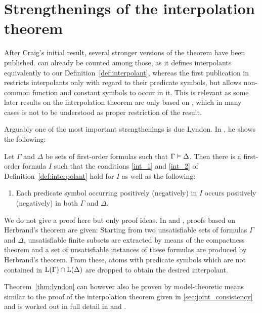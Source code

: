 \section{Strengthenings of the interpolation theorem}
\label{sec:strengthenings}

After Craig's initial result, several stronger versions of the theorem have been published.
\cite{Craig57three} can already be counted among those,
as it defines interpolants equivalently to our Definition~\ref{def:interpolant}, 
whereas the first publication in \cite{Craig57linear} restricts interpolants only with regard to their predicate symbols, but allows non-common function and constant symbols to occur in it.
This is relevant as some later results on the interpolation theorem are only based on \cite{Craig57linear}, which in many cases is not to be understood as proper restriction of the result.


Arguably one of the most important strengthenings is due Lyndon. In \cite{lyndon59}, he shows the following:

\begin{thm}[Lyndon]
	\label{thm:lyndon}
Let $\Gamma$ and $\Delta$ be sets of first-order formulas such that $\Gamma \entails\nolinebreak \Delta$. 
Then there is a first-order formula $I$ such that the conditions \ref{int_1} and \ref{int_2} of Definition~\ref{def:interpolant} hold for $I$ as well as the following:
\begin{enumerate}
		\renewcommand{\theenumi}{\arabic{enumi}'}
		\setcounter{enumi}{2}
	\item Each predicate symbol occurring positively (negatively) in $I$ occurs positively (negatively) in both $\Gamma$ and $\Delta$.
		\label{int_lyndon_3}
\end{enumerate}
\end{thm}

We do not give a proof here but only proof ideas.
In \cite{lyndon59} and \cite{slagle70}, proofs based on Herbrand's theorem are given:
Starting from two unsatisfiable sets of formulas $\Gamma$ and $\Delta$, unsatisfiable finite subsets are extracted by means of the compactness theorem and a set of unsatisfiable instances of these formulas are produced by Herbrand's theorem.
From these, atoms with predicate symbols which are not contained in $\operatorname{L}(\Gamma) \cap \operatorname{L}(\Delta)$ are dropped to obtain the desired interpolant.

Theorem~\ref{thm:lyndon} can however also be proven by model-theoretic means similar to the proof of the interpolation theorem given in \ref{sec:joint_consistency}
and is worked out in full detail in \cite{Henkin63} and \cite[Theorem\ 2.2.24]{chang1990model}.

